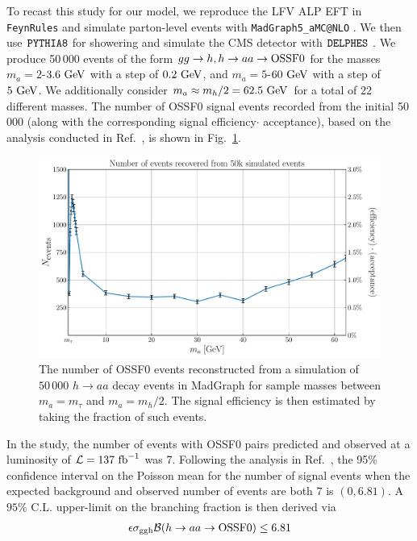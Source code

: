 To recast this study for our model, we reproduce the LFV ALP EFT in \verb|FeynRules| \cite{Alloul:2013bka} and simulate parton-level events with \verb|MadGraph5_aMC@NLO| \cite{Alwall:2011uj}. We then use $\verb|PYTHIA8|$ for showering and simulate the CMS detector with $\verb|DELPHES|$ \cite{deFavereau:2013fsa}. We produce 50\,000 events of the form $gg\rightarrow h, h \rightarrow aa \rightarrow \rm OSSF0$ for the masses $m_a = 2$-$3.6~{\rm GeV}$ with a step of $0.2~{\rm GeV}$, and $m_a = 5$-$60~{\rm GeV}$ with a step of $5~{\rm GeV}$. We additionally consider $m_a \approx m_h/2 = 62.5~{\rm GeV}$ for a total of 22 different masses. The number of OSSF0 signal events recorded from the initial 50\,000 (along with the corresponding signal efficiency$\cdot$ acceptance), based on the analysis conducted in Ref.~\cite{CMS:2019lwf}, is shown in Fig.~\ref{fig:OSSF0_efficiency}. 
\begin{figure}[t!]
    \centering
    \includegraphics[width=0.8\linewidth]{figures/chapter5/H_to_OSSF0_efficiency.pdf}
    \caption[Monte-Carlo estimate of efficiency of CMS search for LFV Higgs-ALP decays.]{The number of OSSF0 events reconstructed from a simulation of $50\,000$ $h\rightarrow aa$ decay events in MadGraph for sample masses between $m_a = m_\tau$ and $m_a = m_h/2$. The signal efficiency is then estimated by taking the fraction of such events.}
    \label{fig:OSSF0_efficiency}
\end{figure}
In the study, the number of events with OSSF0 pairs predicted and observed at a luminosity of ${\cal L}=137~{\rm fb}^{-1}$ was 7. Following the analysis in Ref.~\cite{Feldman:1997qc}, the 95\% confidence interval on the Poisson mean for the number of signal events when the expected background and observed number of events are both $7$ is $(0, 6.81)$. A $95\%$ C.L. upper-limit on the branching fraction is then derived via
\begin{align}
    \epsilon \sigma_{\rm ggh}{\cal B}(h\rightarrow aa \rightarrow {\rm OSSF0}) \leq 6.81
\end{align}
